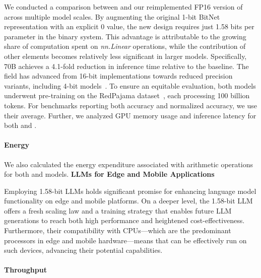 We conducted a comparison between  and our reimplemented FP16 version of  across multiple model scales. By augmenting the original 1-bit BitNet representation with an explicit 0 value, the new design requires just 1.58 bits per parameter in the binary system. This advantage is attributable to the growing share of computation spent on \emph{nn.Linear} operations, while the contribution of other elements becomes relatively less significant in larger models. Specifically,  70B achieves a 4.1-fold reduction in inference time relative to the  baseline. The field has advanced from 16-bit implementations towards reduced precision variants, including 4-bit models~\cite{gptq, awq}. To ensure an equitable evaluation, both models underwent pre-training on the RedPajama dataset~\cite{redpajama}, each processing 100 billion tokens. For benchmarks reporting both accuracy and normalized accuracy, we use their average. Further, we analyzed GPU memory usage and inference latency for both  and . \paragraph{Energy}

We also calculated the energy expenditure associated with arithmetic operations for both  and  models. \textbf{LLMs for Edge and Mobile Applications}

Employing 1.58-bit LLMs holds significant promise for enhancing language model functionality on edge and mobile platforms. On a deeper level, the 1.58-bit LLM offers a fresh scaling law and a training strategy that enables future LLM generations to reach both high performance and heightened cost-effectiveness. Furthermore, their compatibility with CPUs—which are the predominant processors in edge and mobile hardware—means that  can be effectively run on such devices, advancing their potential capabilities. \paragraph{Throughput}

